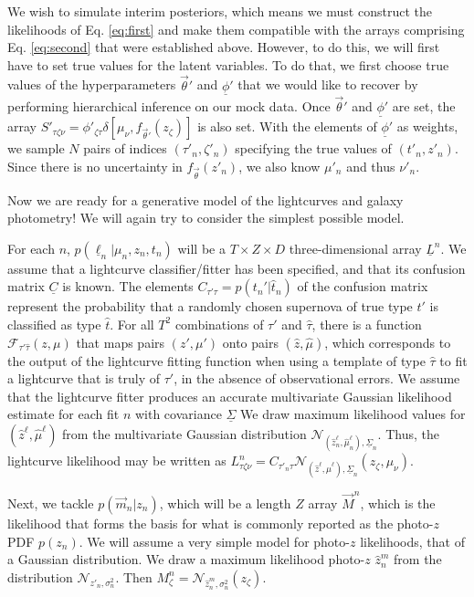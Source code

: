 \documentclass[12pt, onecolumn]{emulateapj}
\newcommand{\textul}{\underline}
\begin{document}
We wish to simulate interim posteriors, which means we must construct the likelihoods of Eq. \ref{eq:first} and make them compatible with the arrays comprising Eq. \ref{eq:second} that were established above.  However, to do this, we will first have to set true values for the latent variables.  To do that, we first choose true values of the hyperparameters $\vec{\theta}'$ and $\textul{\phi}'$ that we would like to recover by performing hierarchical inference on our mock data.  Once $\vec{\theta}'$ and $\textul{\phi}'$ are set, the array $S'_{\tau\zeta\nu}=\phi'_{\zeta\tau}\delta[\mu_{\nu}, f_{\vec{\theta}'}(z_{\zeta})]$ is also set.  With the elements of $\textul{\phi}'$ as weights, we sample $N$ pairs of indices $(\tau'_{n}, \zeta'_{n})$ specifying the true values of $(t'_{n}, z'_{n})$.  Since there is no uncertainty in $f_{\vec{\theta}}(z'_{n})$, we also know $\mu'_{n}$ and thus $\nu'_{n}$.  

Now we are ready for a generative model of the lightcurves and galaxy photometry!  We will again try to consider the simplest possible model.  

For each $n$, $p(\textul{\ell}_{n} | \mu_{n}, z_{n}, t_{n})$ will be a $T\times Z\times D$ three-dimensional array $\textul{L}^{n}$.  We assume that a lightcurve classifier/fitter has been specified, and that its confusion matrix $\textul{C}$ is known.  The elements $C_{\tau'\hat{\tau}} = p(t_{n}' | \hat{t}_{n})$ of the confusion matrix represent the probability that a randomly chosen supernova of true type $t'$ is classified as type $\hat{t}$.  For all $T^{2}$ combinations of $\tau'$ and $\hat{\tau}$, there is a function $\mathcal{F}_{\tau'\hat{\tau}}(z, \mu)$ that maps pairs $(z', \mu')$ onto pairs $(\hat{z}, \hat{\mu})$, which corresponds to the output of the lightcurve fitting function when using a template of type $\hat{\tau}$ to fit a lightcurve that is truly of $\tau'$, in the absence of observational errors.  We assume that the lightcurve fitter produces an accurate multivariate Gaussian likelihood estimate for each fit $n$ with covariance $\textul{\Sigma}$  We draw maximum likelihood values for $(\hat{z}^{\ell}, \hat{\mu}^{\ell})$ from the multivariate Gaussian distribution $\mathcal{N}_{(\hat{z}^{\ell}_{n}, \hat{\mu}^{\ell}_{n}), \textul{\Sigma}_{n}}$.  Thus, the lightcurve likelihood may be written as $L^{n}_{\tau\zeta\nu} = C_{\tau'_{n}\tau}\mathcal{N}_{(\hat{z}^{\ell}, \hat{\mu}^{\ell}), \textul{\Sigma}_{n}}(z_{\zeta}, \mu_{\nu})$.

Next, we tackle $p(\vec{m}_{n} | z_{n})$, which will be a length $Z$ array $\vec{M}^{n}$, which is the likelihood that forms the basis for what is commonly reported as the photo-$z$ PDF $p(z_{n})$.   We will assume a very simple model for photo-$z$ likelihoods, that of a Gaussian distribution.  We draw a maximum likelihood photo-$z$ $\hat{z}_{n}^{m}$ from the distribution $\mathcal{N}_{z'_{n}, \sigma_{n}^{2}}$.  Then $M^{n}_{\zeta}=\mathcal{N}_{\hat{z}_{n}^{m}, \sigma_{n}^{2}}(z_{\zeta})$.
\end{document}
